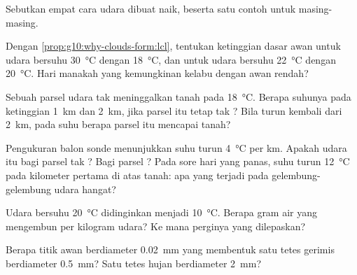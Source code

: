 \begin{exercise}[$\star$]\label{exo:g10:why-clouds-form:5}
Sebutkan empat cara udara dibuat naik, beserta satu contoh untuk masing-masing.
\end{exercise}

\begin{exercise}[$\star\star$]\label{exo:g10:why-clouds-form:6}
Dengan \cref{prop:g10:why-clouds-form:lcl}, tentukan ketinggian dasar awan
untuk udara bersuhu \qty{30}{\degreeCelsius} dengan 
\qty{18}{\degreeCelsius}, dan untuk udara bersuhu \qty{22}{\degreeCelsius}
dengan  \qty{20}{\degreeCelsius}. Hari manakah yang kemungkinan
kelabu dengan awan rendah?
\end{exercise}

\begin{exercise}[$\star\star$]\label{exo:g10:why-clouds-form:7}
Sebuah parsel udara tak  meninggalkan tanah pada
\qty{18}{\degreeCelsius}. Berapa suhunya pada ketinggian \qty{1}{km} dan
\qty{2}{km}, jika parsel itu tetap tak ? Bila turun kembali dari
\qty{2}{km}, pada suhu berapa parsel itu mencapai tanah?
\end{exercise}

\begin{exercise}[$\star\star$]\label{exo:g10:why-clouds-form:8}
Pengukuran balon sonde menunjukkan suhu turun \qty{4}{\degreeCelsius} per km.
Apakah udara itu  bagi parsel tak ? Bagi parsel ? Pada sore
hari yang panas, suhu turun \qty{12}{\degreeCelsius} pada kilometer pertama di
atas tanah: apa yang terjadi pada gelembung-gelembung udara hangat?
\end{exercise}

\begin{exercise}[$\star\star$]\label{exo:g10:why-clouds-form:9}
Udara  bersuhu \qty{20}{\degreeCelsius} didinginkan menjadi
\qty{10}{\degreeCelsius}. Berapa gram air yang mengembun per kilogram udara?
Ke mana perginya  yang dilepaskan?
\end{exercise}

\begin{exercise}[$\star\star$]\label{exo:g10:why-clouds-form:10}
Berapa titik awan berdiameter \qty{0.02}{mm} yang membentuk satu tetes gerimis
berdiameter \qty{0.5}{mm}? Satu tetes hujan berdiameter \qty{2}{mm}?
\end{exercise}

